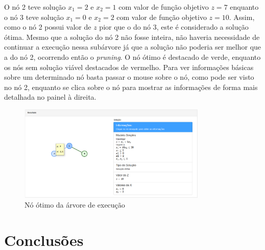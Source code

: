\documentclass [11pt]{articleSBPO}
\begin{document}
O nó 2 teve solução $x_{1}=2$ e $x_{2}=1$ com valor de função objetivo $z = 7$ enquanto o nó 3 teve solução $x_{1}=0$ e $x_{2}=2$ com valor de função objetivo $z = 10$. Assim, como o nó 2 possui valor de $z$ pior que o do nó 3, este é considerado a solução ótima. Mesmo que a solução do nó 2 não fosse inteira, não haveria necessidade de continuar a execução nessa subárvore já que a solução não poderia ser melhor que a do nó 2, ocorrendo então o \textit{pruning}. O nó ótimo é destacado de verde, enquanto os nós sem solução viável destacados de vermelho. Para ver informações básicas sobre um determinado nó basta passar o mouse sobre o nó, como pode ser visto no nó 2, enquanto se clica sobre o nó para mostrar as informações de forma mais detalhada no painel à direita.

\begin{figure}[!h]
	\centering
	\includegraphics[width=0.8\textwidth]{img/bbno3.png}
	\caption[]{Nó ótimo da árvore de execução}
	\label{fig:bbno3}
\end{figure}

\section{Conclusões}\label{sec:conclusao}

\newpage



\end{document}
